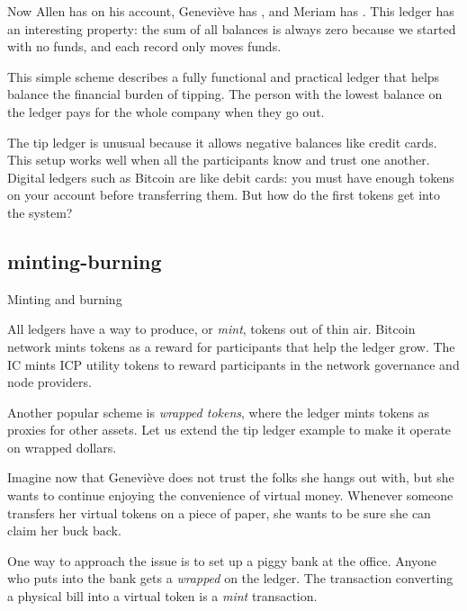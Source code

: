 \documentclass{article}
\begin{document}
Now Allen has  on his account, Geneviève has , and Meriam has .
This ledger has an interesting property: the sum of all balances is always zero because we started with no funds, and each record only moves funds.

This simple scheme describes a fully functional and practical ledger that helps balance the financial burden of tipping.
The person with the lowest balance on the ledger pays for the whole company when they go out.

The tip ledger is unusual because it allows negative balances like credit cards.
This setup works well when all the participants know and trust one another.
Digital ledgers such as Bitcoin are like debit cards: you must have enough tokens on your account before transferring them.
But how do the first tokens get into the system?

\subsection{minting-burning}{Minting and burning}

All ledgers have a way to produce, or \emph{mint}, tokens out of thin air.
Bitcoin network mints tokens as a reward for participants that help the ledger grow.
The IC mints ICP utility tokens to reward participants in the network governance and node providers.

Another popular scheme is \emph{wrapped tokens}, where the ledger mints tokens as proxies for other assets.
Let us extend the tip ledger example to make it operate on wrapped dollars.

Imagine now that Geneviève does not trust the folks she hangs out with, but she wants to continue enjoying the convenience of virtual money.
Whenever someone transfers her virtual tokens on a piece of paper, she wants to be sure she can claim her buck back.

One way to approach the issue is to set up a piggy bank at the office.
Anyone who puts  into the bank gets a \emph{wrapped}  on the ledger.
The transaction converting a physical bill into a virtual token is a \emph{mint} transaction.
\end{document}

